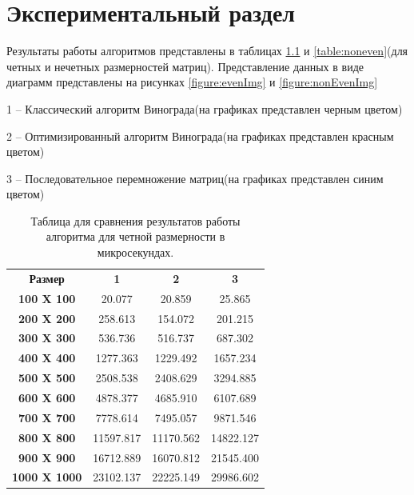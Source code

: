 \chapter{ Экспериментальный раздел}
Результаты работы алгоритмов представлены в таблицах \ref{table:even} и \ref{table:noneven}(для четных и нечетных размерностей матриц). Представление данных в виде диаграмм представлены на рисунках \ref{figure:evenImg} и \ref{figure:nonEvenImg}

1 -- Классический алгоритм Винограда(на графиках представлен черным цветом)

2 -- Оптимизированный алгоритм Винограда(на графиках представлен красным цветом)

3 -- Последовательное перемножение матриц(на графиках представлен синим цветом)

\begin{table}
	\caption{Таблица для сравнения результатов работы алгоритма для четной размерности в микросекундах.}\label{table:even}
	\begin{center}
		\begin{tabular}{cccc}
            \textbf{Размер} & \textbf{1} & \textbf{2} & \textbf{3}\\
            \textbf{100 X 100} & 20.077 & 20.859 & 25.865 \\
            \textbf{200 X 200} & 258.613 & 154.072 & 201.215 \\
            \textbf{300 X 300} & 536.736 & 516.737 & 687.302 \\
            \textbf{400 X 400} & 1277.363 & 1229.492 & 1657.234 \\
            \textbf{500 X 500} & 2508.538 & 2408.629 & 3294.885 \\
            \textbf{600 X 600} & 4878.377 & 4685.910 & 6107.689 \\
            \textbf{700 X 700} & 7778.614 & 7495.057 & 9871.546 \\
            \textbf{800 X 800} & 11597.817 & 11170.562 & 14822.127 \\
            \textbf{900 X 900} & 16712.889 & 16070.812 & 21545.400 \\
            \textbf{1000 X 1000} & 23102.137 & 22225.149 & 29986.602 \\
		\end{tabular}
	\end{center}
\end{table}

